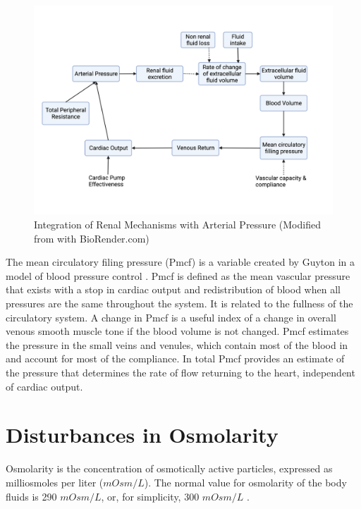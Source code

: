 \begin{figure}[!h]
    \centering
    \includegraphics[width=1\linewidth]{./figure/integrated_renal_bp.png}
    \caption{Integration of Renal Mechanisms with Arterial Pressure  \footnotesize{(Modified from \cite{hall_guyton_2020} with BioRender.com)}}
    \label{fig:integrated_renal_bp}
\end{figure}

The mean circulatory filing pressure (Pmcf) is a variable created by Guyton in a model of blood pressure control \cite{rothe_mean_1993}. Pmcf is defined as the mean vascular pressure that exists with a stop in cardiac output and redistribution of blood when all pressures are the same throughout the system. It is related to the fullness of the circulatory system. A change in Pmcf is a useful index of a change in overall venous smooth muscle tone if the blood volume is not changed. Pmcf estimates the pressure in the small veins and venules, which contain most of the blood in and account for most of the compliance. In total Pmcf provides an estimate of the pressure that determines the rate of flow returning to the heart, independent of cardiac output.

\section{Disturbances in Osmolarity}

Osmolarity is the concentration of osmotically active particles, expressed as milliosmoles per liter ($mOsm/L$). The normal value for osmolarity of the body fluids is 290 $mOsm/L$, or, for simplicity, 300 $mOsm/L$ \cite{costanzo_physiology_2013}.

